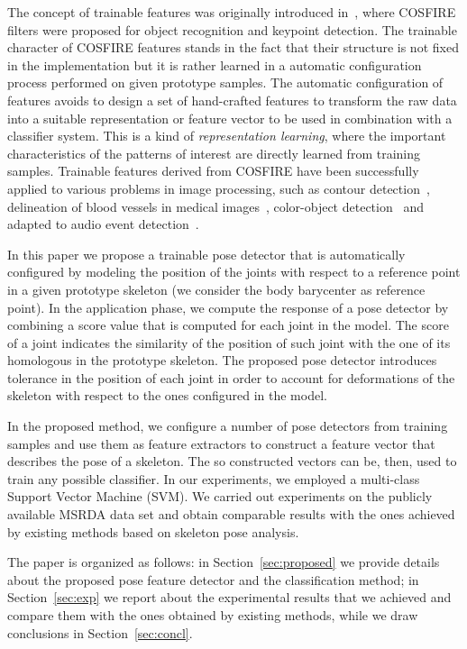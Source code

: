 \documentclass[runningheads,a4paper]{llncs}
\begin{document}
The concept of trainable features was originally introduced in~\cite{Azzopardi13}, where COSFIRE filters were proposed for object recognition and keypoint detection. 
The trainable character of COSFIRE features stands in the fact that their structure is not fixed in the implementation but it is rather learned in a automatic configuration process performed on given prototype samples.  
The automatic configuration of features avoids to design a set of hand-crafted features to transform the raw data into a suitable representation or feature vector to be used in combination with a classifier system.
This is a kind of \emph{representation learning}, where the important characteristics of the patterns of interest are directly learned from training samples. 
Trainable features derived from COSFIRE have been successfully applied to various problems in image processing, such as contour detection~\cite{AzzopardiPetkovCORF2012}, delineation of blood vessels in medical images~\cite{AzzopardiMEDIA2015,StrisciuglioVIP15}, color-object detection~\cite{Gecer2017} and adapted to audio event detection~\cite{StrisciuglioCOPE2016}.	

In this paper we propose a trainable pose detector that is automatically configured by modeling the position of the joints with respect to a reference point in a given prototype skeleton (we consider the body barycenter as reference point). 
In the application phase, we compute the response of a pose detector by combining a score value that is computed for each joint in the model. The score of a joint indicates the similarity of the position of such joint with the one of its homologous in the prototype skeleton.
The proposed pose detector introduces tolerance in the position of each joint  in order to account for deformations of the skeleton with respect to the ones configured in the model.

In the proposed method, we configure a number of pose detectors from training samples and use them as feature extractors to construct a feature vector that describes the pose of a skeleton. The so constructed vectors can be, then, used to train any possible classifier. In our experiments, we employed a multi-class Support Vector Machine (SVM).
We carried out experiments on the publicly available MSRDA data set and obtain comparable results with the ones achieved by existing methods based on skeleton pose analysis. 


The paper is organized as follows: in Section~\ref{sec:proposed} we provide details about the proposed pose feature detector and the classification method; in Section~\ref{sec:exp} we report about the experimental results that we achieved and compare them with the ones obtained by existing methods, while we draw conclusions in Section~\ref{sec:concl}.
 
\end{document}
